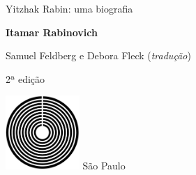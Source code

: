 




\begingroup\thispagestyle{empty}\vspace*{.05\textheight} 

              \formular
              
              \LARGE\noindent
              Yitzhak Rabin: uma biografia

                      

              \bigskip  
              
              \Large\noindent\textbf{Itamar Rabinovich}

              \vfill
              {\fontsize{30}{40}%
              \small\noindent 
              Samuel Feldberg e Debora Fleck (\textit{tradução})}
              
              \bigskip

              \noindent
              {\fontsize{30}{40}%
              \small\noindent 2ª edição}
              

              \vfill\noindent\includegraphics[width=0.21\textwidth]{logo}
              \break{} 
              \smallskip
              {\fontsize{30}{40}%
              \scriptsize\noindent{}São Paulo\quad\the\year}

\endgroup
\pagebreak
